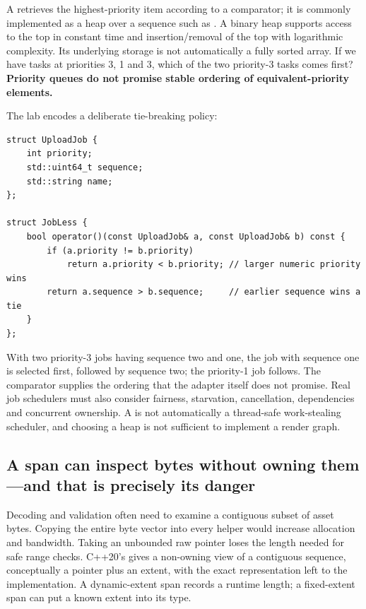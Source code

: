 A  retrieves the highest-priority item according to a comparator; it is commonly implemented as a heap over a sequence such as . A binary heap supports access to the top in constant time and insertion/removal of the top with logarithmic complexity. Its underlying storage is not automatically a fully sorted array. If we have tasks at priorities 3, 1 and 3, which of the two priority-3 tasks comes first? \textbf{Priority queues do not promise stable ordering of equivalent-priority elements.}

The lab encodes a deliberate tie-breaking policy:

\begin{verbatim}
struct UploadJob {
    int priority;
    std::uint64_t sequence;
    std::string name;
};

struct JobLess {
    bool operator()(const UploadJob& a, const UploadJob& b) const {
        if (a.priority != b.priority)
            return a.priority < b.priority; // larger numeric priority wins
        return a.sequence > b.sequence;     // earlier sequence wins a tie
    }
};
\end{verbatim}

With two priority-3 jobs having sequence two and one, the job with sequence one is selected first, followed by sequence two; the priority-1 job follows. The comparator supplies the ordering that the adapter itself does not promise. Real job schedulers must also consider fairness, starvation, cancellation, dependencies and concurrent ownership. A  is not automatically a thread-safe work-stealing scheduler, and choosing a heap is not sufficient to implement a render graph.

\subsection{A span can inspect bytes without owning them---and that is precisely its danger}\label{01-foundations-i-ch006-a-span-can-inspect-bytes-without-owning-themand-that-is-precisely-its-danger}

\hypertarget{01-foundations-i-ch006-a-span-can-inspect-bytes-without-owning-themand-that-is-precisely-its-danger}{}

Decoding and validation often need to examine a contiguous subset of asset bytes. Copying the entire byte vector into every helper would increase allocation and bandwidth. Taking an unbounded raw pointer loses the length needed for safe range checks. C++20's  gives a non-owning view of a contiguous sequence, conceptually a pointer plus an extent, with the exact representation left to the implementation. A dynamic-extent span records a runtime length; a fixed-extent span can put a known extent into its type.

